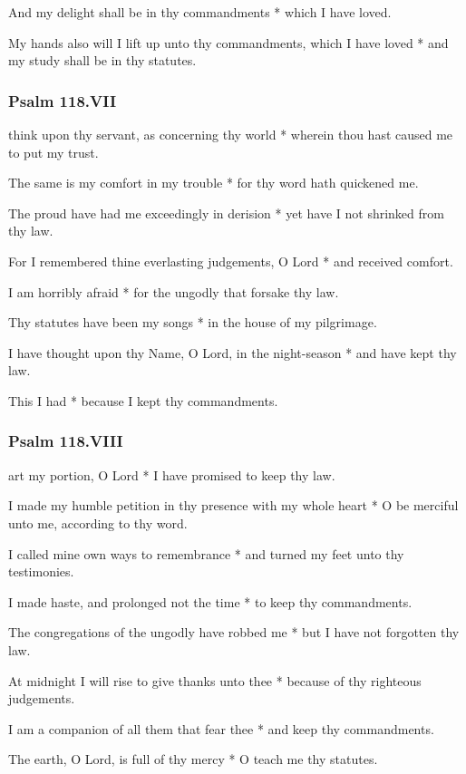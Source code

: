 And my delight shall be in thy commandments * which I have loved.

My hands also will I lift up unto thy commandments, which I have loved * and my study shall be in thy statutes.

\subsubsection{Psalm 118.VII}

 think upon thy servant, as concerning thy world * wherein thou hast caused me to put my trust.

The same is my comfort in my trouble * for thy word hath quickened me.

The proud have had me exceedingly in derision * yet have I not shrinked from thy law.

For I remembered thine everlasting judgements, O Lord * and received comfort.

I am horribly afraid * for the ungodly that forsake thy law.

Thy statutes have been my songs * in the house of my pilgrimage.

I have thought upon thy Name, O Lord, in the night-season * and have kept thy law.

This I had * because I kept thy commandments.

\subsubsection{Psalm 118.VIII}

 art my portion, O Lord * I have promised to keep thy law.

I made my humble petition in thy presence with my whole heart * O be merciful unto me, according to thy word.

I called mine own ways to remembrance * and turned my feet unto thy testimonies.

I made haste, and prolonged not the time * to keep thy commandments.

The congregations of the ungodly have robbed me * but I have not forgotten thy law.

At midnight I will rise to give thanks unto thee * because of thy righteous judgements.

I am a companion of all them that fear thee * and keep thy commandments.

The earth, O Lord, is full of thy mercy * O teach me thy statutes.

